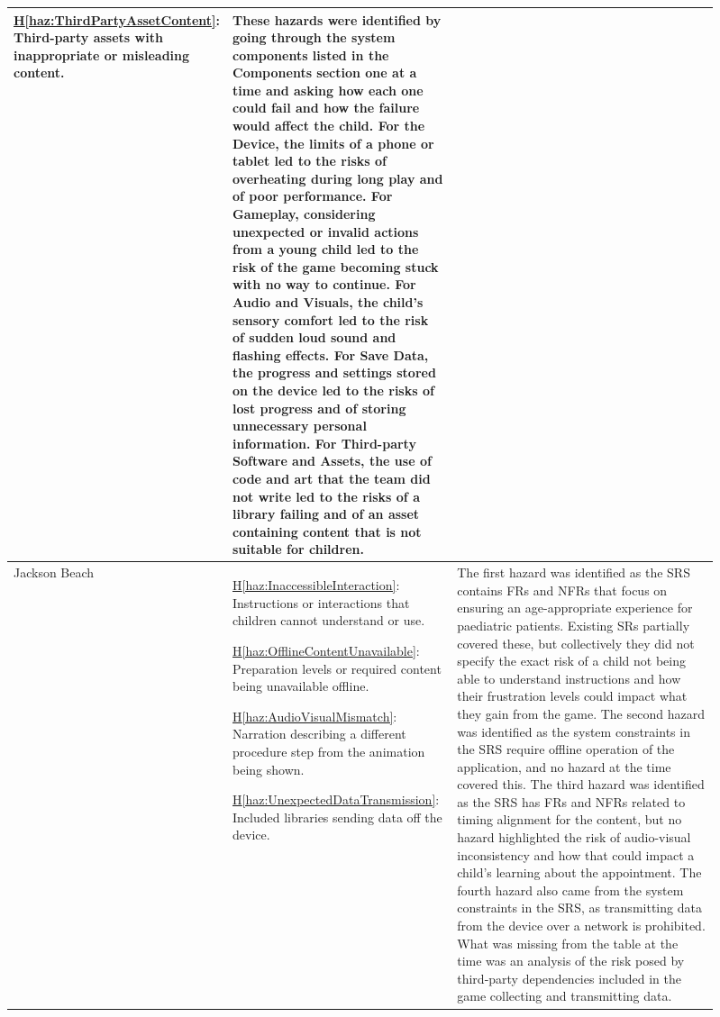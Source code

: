 \documentclass{article}
\newcounter{hazard}
\newcommand{\hazref}[1]{\hyperref[haz:#1]{H\ref*{haz:#1}}}
\begin{document}
\begin{enumerate}
\begin{longtable}{@{}
        p{0.17\linewidth}
        p{0.32\linewidth}
        p{0.42\linewidth}
    @{}}
    \hazref{ThirdPartyAssetContent}: Third-party assets with
    inappropriate or misleading content.
    &
    These hazards were identified by going through the system
    components listed in the Components section one at a time and
    asking how each one could fail and how the failure would affect
    the child. For the Device, the limits of a phone or tablet
    led to the risks of overheating during long play and of poor
    performance. For Gameplay, considering unexpected or invalid
    actions from a young child led to the risk of the game becoming
    stuck with no way to continue. For Audio and Visuals, the
    child's sensory comfort led to the risk of sudden loud sound
    and flashing effects. For Save Data, the progress and settings
    stored on the device led to the risks of lost progress and of
    storing unnecessary personal information. For
    Third-party Software and Assets, the use of code and art that
    the team did not write led to the risks of a library failing
    and of an asset containing content that is not suitable for
    children. \\
    \midrule

    Jackson Beach &
    \hazref{InaccessibleInteraction}: Instructions or
    interactions that children cannot understand or use.

    \hazref{OfflineContentUnavailable}: Preparation levels
    or required content being unavailable offline.

    \hazref{AudioVisualMismatch}: Narration describing a
    different procedure step from the animation being shown.

    \hazref{UnexpectedDataTransmission}: Included libraries
    sending data off the device.
    &
    The first hazard was identified as the SRS contains FRs and NFRs
    that focus on ensuring an age-appropriate experience for paediatric
    patients. Existing SRs partially covered these, but collectively
    they did not specify the exact risk of a child not being able to
    understand instructions and how their frustration levels could
    impact what they gain from the game. The second hazard was
    identified as the system constraints in the SRS require offline
    operation of the application, and no hazard at the time covered
    this. The third hazard was identified as the SRS has FRs and NFRs
    related to timing alignment for the content, but no hazard
    highlighted the risk of audio-visual inconsistency and how that
    could impact a child's learning about the appointment. The fourth
    hazard also came from the system constraints in the SRS, as
    transmitting data from the device over a network is prohibited.
    What was missing from the table at the time was an analysis of
    the risk posed by third-party dependencies included in the game
    collecting and transmitting data. \\


\end{longtable}
\end{enumerate}
\end{document}
